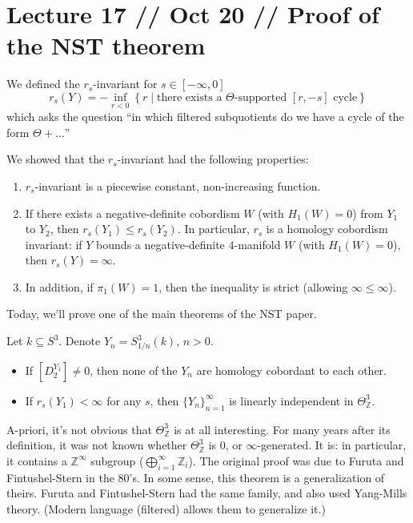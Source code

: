\documentclass[main]{subfiles}
\begin{document}
\section*{Lecture 17 // Oct 20 // Proof of the NST theorem}

\begin{recall}
We defined the $r_s$-invariant for $s\in[-\infty,0]$
\[
r_s(Y) = -\inf_{r<0}\left\{r \mid \text{there exists a } \Theta\text{-supported } [r,-s] \text{ cycle}\right\}
\]
which asks the question ``in which filtered subquotients do we have a cycle of the form $\Theta+\dots$''

We showed that the $r_s$-invariant had the following properties:
\begin{enumerate}
\item $r_s$-invariant is a piecewise constant, non-increasing function.
\item If there exists a negative-definite cobordism $W$ (with $H_1(W)=0$) from $Y_1$ to $Y_2$, then $r_s(Y_1)\leq r_s(Y_2)$. In particular, $r_s$ is a homology cobordism invariant: if $Y$ bounds a negative-definite $4$-manifold $W$ (with $H_1(W)=0$), then $r_s(Y) = \infty$.
\item In addition, if $\pi_1(W)=1$, then the inequality is strict (allowing $\infty\leq\infty$).
\end{enumerate}
\end{recall}

Today, we'll prove one of the main theorems of the NST paper.

\begin{theorem}[NST]\label{thm:nst}
Let $k\subseteq S^3$. Denote $Y_n = S^3_{1/n}(k)$, $n>0$.
\begin{itemize}
\item If $[D_2^{Y_1}]\neq 0$, then none of the $Y_n$ are homology cobordant to each other.
\item If $r_s(Y_1) < \infty$ for any $s$, then $\{Y_n\}_{n=1}^\infty$ is linearly independent in $\Theta^3_{\mathbb{Z}}$.
\end{itemize}
\end{theorem}

\begin{remark}
A-priori, it's not obvious that $\Theta^3_{\mathbb{Z}}$ is at all interesting. For many years after its definition, it was not known whether $\Theta^3_{\mathbb{Z}}$ is $0$, or $\infty$-generated. It is: in particular, it contains a $\mathbb{Z}^\infty$ subgroup ($\bigoplus_{i=1}^\infty \mathbb{Z}_i$). The original proof was due to Furuta and Fintushel-Stern in the 80's. In some sense, this theorem is a generalization of theirs. Furuta and Fintushel-Stern had the same family, and also used Yang-Mills theory. (Modern language (filtered) allows them to generalize it.)
\end{remark}
\end{document}
